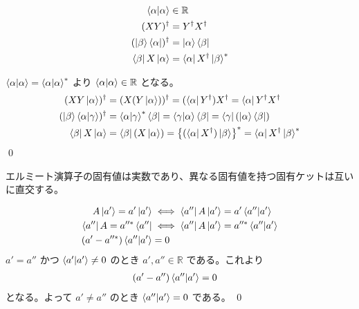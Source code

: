 \documentclass[uplatex,dvipdfmx,a4paper,11pt]{jlreq}
\makeatletter
\newcommand{\RR}{\mathbb{R}}
\theoremstyle{definition}
\renewenvironment{proof}[1][\proofname]{\par
  \normalfont
  \topsep6\p@\@plus6\p@ \trivlist
  \item[\hskip\labelsep{\bfseries #1}\@addpunct{\bfseries}]\ignorespaces\quad\par
}{%
  \qed\endtrivlist\@endpefalse
}
\renewcommand\proofname{証明}
\makeatother
\begin{document}
\begin{proposition}
  \begin{align}
    \braket{\alpha|\alpha}            & \in\RR                               \\
    (XY)^\dagger                      & = Y^\dagger X^\dagger                \\
    (\ket{\beta}\bra{\alpha})^\dagger & = \ket{\alpha}\bra{\beta}            \\
    \bra{\beta}X\ket{\alpha}          & = \bra{\alpha}X^\dagger\ket{\beta}^*
  \end{align}
\end{proposition}
\begin{proof}
  $\braket{\alpha|\alpha} = \braket{\alpha|\alpha}^*$ より $\braket{\alpha|\alpha}\in\RR$ となる。
  \begin{align}
    (XY\ket{\alpha})^\dagger                    & = (X(Y\ket{\alpha}))^\dagger = (\bra{\alpha}Y^\dagger)X^\dagger = \bra{\alpha}Y^\dagger X^\dagger                 \\
    (\ket{\beta}\braket{\alpha|\gamma})^\dagger & = \braket{\alpha|\gamma}^*\bra{\beta} = \braket{\gamma|\alpha}\bra{\beta} = \bra{\gamma}(\ket{\alpha}\bra{\beta}) \\
    \bra{\beta}X\ket{\alpha}                    & = \bra{\beta}(X\ket{\alpha}) = \qty{(\bra{\alpha}X^\dagger)\ket{\beta}}^* = \bra{\alpha}X^\dagger\ket{\beta}^*
  \end{align}
\end{proof}

\begin{theorem}[エルミート演算子の固有ケットの直交性]
  エルミート演算子の固有値は実数であり、異なる固有値を持つ固有ケットは互いに直交する。
\end{theorem}
\begin{proof}
  \begin{align}
    A\ket{a'} = a'\ket{a'}      & \iff \bra{a''}A\ket{a'} = a'\braket{a''|a'}    \\
    \bra{a''}A = a''^*\bra{a''} & \iff \bra{a''}A\ket{a'} = a''^*\braket{a''|a'} \\
    (a' - a''^*)\braket{a''|a'} & = 0
  \end{align}
  $a' = a''$ かつ $\braket{a'|a'} \neq 0$ のとき $a', a''\in\RR$ である。これより
  \begin{align}
    (a' - a'')\braket{a''|a'} & = 0
  \end{align}
  となる。よって $a' \neq a''$ のとき $\braket{a''|a'} = 0$ である。
\end{proof}
\end{document}
